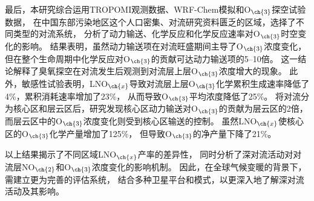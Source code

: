 {最后，本研究综合运用TROPOMI观测数据、WRF-Chem模拟和O$_{\ch{3}}$探空试验数据，
在中国东部污染地区这个人口密集、对流研究资料匮乏的区域，选择了不同类型的对流系统，
分析了动力输送、化学反应和化学反应速率对O$_{\ch{3}}$时空变化的影响。
结果表明，虽然动力输送项在对流旺盛期间主导了O$_{\ch{3}}$浓度变化，
但在整个生命周期中化学反应对O$_{\ch{3}}$的贡献可达动力输送项的5--10倍。
这一结论解释了臭氧探空在对流发生后观测到对流层上层O$_{\ch{3}}$浓度增大的现象。
此外，敏感性试验表明，LNO$_{\ch{x}}$导致对流层上层O$_{\ch{3}}$化学累积生成速率降低了4\%，累积消耗速率增加了23\%，
从而导致O$_{\ch{3}}$平均浓度降低了25\%。
将对流分为核心区和层云区后，研究发现核心区动力输送对O$_{\ch{3}}$的贡献为层云区的2倍，
而层云区中的O$_{\ch{3}}$浓度变化则受到核心区输送的控制。
虽然LNO$_{\ch{x}}$使核心区的O$_{\ch{3}}$化学产量增加了125\%，
但导致O$_{\ch{3}}$的净产量下降了21\%。

以上结果揭示了不同区域LNO$_{\ch{x}}$产率的差异性，
同时分析了深对流活动对对流层NO$_{\ch{2}}$和O$_{\ch{3}}$浓度变化的影响机制。
因此，在全球气候变暖的背景下，需建立更为完善的评估系统，
结合多种卫星平台和模式，以更深入地了解深对流活动及其影响。
}
